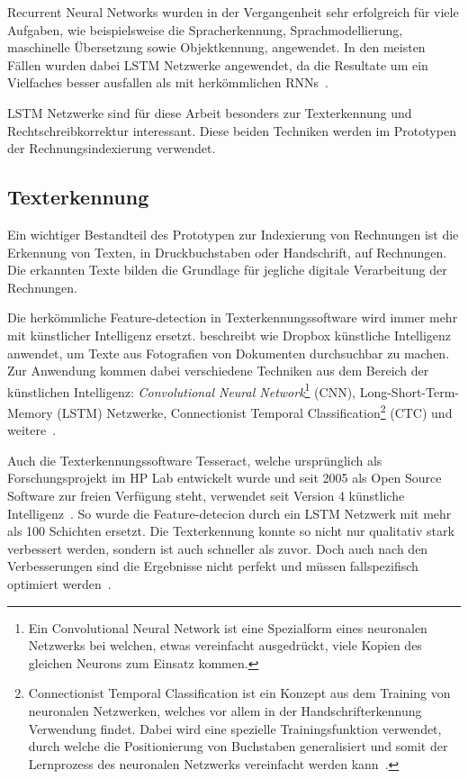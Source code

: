 Recurrent Neural Networks wurden in der Vergangenheit sehr erfolgreich für viele Aufgaben, wie beispielsweise die Spracherkennung, Sprachmodellierung, maschinelle Übersetzung sowie Objektkennung, angewendet. In den meisten Fällen wurden dabei LSTM Netzwerke angewendet, da die Resultate um ein Vielfaches besser ausfallen als mit herkömmlichen RNNs~\autocite{Olah2015}.

LSTM Netzwerke sind für diese Arbeit besonders zur Texterkennung und Rechtschreibkorrektur interessant. Diese beiden Techniken werden im Prototypen der Rechnungsindexierung verwendet.

\subsection{Texterkennung}

Ein wichtiger Bestandteil des Prototypen zur Indexierung von Rechnungen ist die Erkennung von Texten, in Druckbuchstaben oder Handschrift, auf Rechnungen. Die erkannten Texte bilden die Grundlage für jegliche digitale Verarbeitung der Rechnungen.

Die herkömmliche Feature-detection in Texterkennungssoftware wird immer mehr mit künstlicher Intelligenz ersetzt. \textcite{Neuberg2017} beschreibt wie Dropbox künstliche Intelligenz anwendet, um Texte aus Fotografien von Dokumenten durchsuchbar zu machen. Zur Anwendung kommen dabei verschiedene Techniken aus dem Bereich der künstlichen Intelligenz: \textit{Convolutional Neural Network}\footnote{Ein Convolutional Neural Network ist eine Spezialform eines neuronalen Netzwerks bei welchen, etwas vereinfacht ausgedrückt, viele Kopien des gleichen Neurons zum Einsatz kommen\autocite{Olah2014}.} (CNN), Long-Short-Term-Memory (LSTM) Netzwerke, Connectionist Temporal Classification\footnote{Connectionist Temporal Classification ist ein Konzept aus dem Training von neuronalen Netzwerken, welches vor allem in der Handschrifterkennung Verwendung findet. Dabei wird eine spezielle Trainingsfunktion verwendet, durch welche die Positionierung von Buchstaben generalisiert und somit der Lernprozess des neuronalen Netzwerks vereinfacht werden kann~\autocite{Scheidl2018}.} (CTC) und weitere~\autocite{Neuberg2017}.

Auch die Texterkennungssoftware Tesseract, welche ursprünglich als Forschungsprojekt im HP Lab entwickelt wurde und seit 2005 als Open Source Software zur freien Verfügung steht, verwendet seit Version 4 künstliche Intelligenz~\autocite{Smith2007}. So wurde die Feature-detecion durch ein LSTM Netzwerk mit mehr als 100 Schichten ersetzt. Die Texterkennung konnte so nicht nur qualitativ stark verbessert werden, sondern ist auch schneller als zuvor. Doch auch nach den Verbesserungen sind die Ergebnisse nicht perfekt und müssen fallspezifisch optimiert werden~\autocite{O.V.2018, O.V.2018a}.

